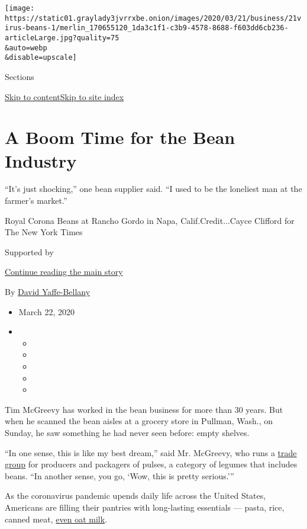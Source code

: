 \texttt{[image: https://static01.graylady3jvrrxbe.onion/images/2020/03/21/business/21virus-beans-1/merlin\_170655120\_1da3c1f1-c3b9-4578-8688-f603dd6cb236-articleLarge.jpg?quality=75\\\&auto=webp\\\&disable=upscale]}

Sections

\protect\hyperlink{site-content}{Skip to
content}\protect\hyperlink{site-index}{Skip to site index}

\hypertarget{a-boom-time-for-the-bean-industry}{%
\section{A Boom Time for the Bean
Industry}\label{a-boom-time-for-the-bean-industry}}

``It's just shocking,'' one bean supplier said. ``I used to be the
loneliest man at the farmer's market.''

Royal Corona Beans at Rancho Gordo in Napa, Calif.Credit...Cayce
Clifford for The New York Times

Supported by

\protect\hyperlink{after-sponsor}{Continue reading the main story}

By \href{http://www.nytimes3xbfgragh.onion/by/david-yaffe-bellany}{David
Yaffe-Bellany}

\begin{itemize}
\item
  March 22, 2020
\item
  \begin{itemize}
  \item
  \item
  \item
  \item
  \item
  \end{itemize}
\end{itemize}

Tim McGreevy has worked in the bean business for more than 30 years. But
when he scanned the bean aisles at a grocery store in Pullman, Wash., on
Sunday, he saw something he had never seen before: empty shelves.

``In one sense, this is like my best dream,'' said Mr. McGreevy, who
runs a
\href{https://www.usapulses.org/membership/american-pulse-association}{trade
group} for producers and packagers of pulses, a category of legumes that
includes beans. ``In another sense, you go, `Wow, this is pretty
serious.'''

As the coronavirus pandemic upends daily life across the United States,
Americans are filling their pantries with long-lasting essentials ---
pasta, rice, canned meat,
\href{https://www.bloomberg.com/news/articles/2020-03-04/what-s-being-stockpiled-in-american-pandemic-pantry-oat-milk}{even
oat milk}.

